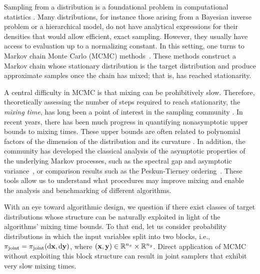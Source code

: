 \documentclass[onefignum,onetabnum]{siamonline250211}
\renewcommand{\d} {{\rm d}}                                %
\newcommand{\bfx}{{\bf x}}
\newcommand{\bfy}{{\bf y}}
\newcommand{\bbR}{\mathbb{R}}
\newcommand{\nx}{{n_{x}}}
\newcommand{\ny}{{n_{y}}}
\newcommand{\pjoint}{\pi_{\rm joint}}
\begin{document}
%

%

%

Sampling from a distribution is a foundational problem in computational statistics \cite{andrieu_introduction_2003,ghanem_bayesian_2017}.
Many distributions, for instance those arising from a Bayesian inverse problem or a hierarchical model, do not have analytical expressions for their densities that would allow efficient, exact sampling.
However, they usually have access to evaluation up to a normalizing constant.
In this setting, one turns to Markov chain Monte Carlo (MCMC) methods~\cite{hastings_monte_1970,metropolis_equation_1953,robert_monte_2004}.
These methods construct a Markov chain whose stationary distribution is the target distribution and produce approximate samples once the chain has mixed; that is, has reached stationarity.

A central difficulty in MCMC is that mixing can be prohibitively slow.
Therefore, theoretically assessing the number of steps required to reach stationarity, the \emph{mixing time}, has long been a point of interest in the sampling community \cite{brown_convergence_2024}.
In recent years, there has been much progress in quantifying nonasymptotic upper bounds to mixing times.
These upper bounds are often related to polynomial factors of the dimension of the distribution and its curvature \cite{altschuler_faster_2024,wu_minimax_2022,chewi_analysis_2025,altschuler_resolving_2022,dwivedi_log-concave_2019}.
In addition, the community has developed the classical analysis of the asymptotic properties of the underlying Markov processes, such as the spectral gap and asymptotic variance~\cite{douc_markov_2018,andrieu_explicit_2024}, or comparison results such as the Peskun-Tierney ordering~\cite{peskun_optimum_1973,tierney_markov_1994}.
These tools allow us to understand what procedures may improve mixing and enable the analysis and benchmarking of different algorithms.

%
%
%
%
%
%
%

With an eye toward algorithmic design, we question if there exist classes of target distributions whose structure can be naturally exploited in light of the algorithms' mixing time bounds.
To that end, let us consider probability distributions in which the input variables split into two blocks, i.e., $\pjoint = \pjoint(\d \bfx, \d \bfy)$, where $(\bfx, \bfy) \in \bbR^{\nx} \times \bbR^{\ny}$.
Direct application of MCMC without exploiting this block structure can result in joint samplers that exhibit very slow mixing times.
\end{document}
